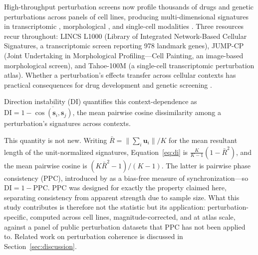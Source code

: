 \documentclass[11pt]{article}
\begin{document}
High-throughput perturbation screens now profile thousands of drugs and
genetic perturbations across panels of cell lines, producing
multi-dimensional signatures in transcriptomic
\citep{lamb2006connectivity, subramanian2017next}, morphological
\citep{bray2016cell}, and single-cell modalities \citep{tahoe2025}.  Three
resources recur throughout: LINCS L1000 (Library of Integrated Network-Based
Cellular Signatures, a transcriptomic screen reporting 978 landmark genes),
JUMP-CP (Joint Undertaking in Morphological Profiling---Cell Painting, an
image-based morphological screen), and Tahoe-100M (a single-cell
transcriptomic perturbation atlas).
Whether a perturbation's effects transfer across cellular contexts has
practical consequences for drug development and genetic screening
\citep{mcfarland2020context, tower2026confound}.

Direction instability (DI) quantifies this context-dependence as
$\mathrm{DI} = 1 - \overline{\cos(\mathbf{s}_i, \mathbf{s}_j)}$, the
mean pairwise cosine dissimilarity among a perturbation's signatures
across contexts.

This quantity is not new.  Writing $\bar{R} = \|\sum_i \mathbf{u}_i\|/K$ for
the mean resultant length of the unit-normalized signatures,
Equation~\ref{eq:di} is $\frac{K}{K-1}(1 - \bar{R}^2)$, and the mean pairwise
cosine is $(K\bar{R}^2 - 1)/(K-1)$.  The latter is pairwise phase consistency
(PPC), introduced by \citet{vinck2010ppc} as a bias-free measure of
synchronization---so $\mathrm{DI} = 1 - \mathrm{PPC}$.  PPC was designed for
exactly the property claimed here, separating consistency from apparent
strength due to sample size.  What this study contributes is therefore not the
statistic but its application: perturbation-specific, computed across cell
lines, magnitude-corrected, and at atlas scale, against a panel of public
perturbation datasets that PPC has not been applied to.  Related work on
perturbation coherence is discussed in Section~\ref{sec:discussion}.
\end{document}
